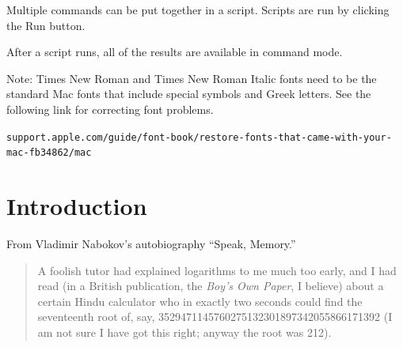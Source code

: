 \documentclass[12pt]{article}
\begin{document}
Multiple commands can be put together in a script.
Scripts are run by clicking the Run button.

\begin{center}
\end{center}

After a script runs, all of the results are available in command mode.

\bigskip
Note: Times New Roman and Times New Roman Italic fonts need
to be the standard Mac fonts that include special symbols and Greek letters.
See the following link for correcting font problems.

\bigskip
{\footnotesize\verb$support.apple.com/guide/font-book/restore-fonts-that-came-with-your-mac-fb34862/mac$}

\newpage

\section{Introduction}

From Vladimir Nabokov's autobiography ``Speak, Memory.''
\begin{quote}
A foolish tutor had explained logarithms to me much too early, and I had
read (in a British publication, the {\it Boy's Own Paper}, I believe)
about a certain Hindu calculator who in exactly two seconds could find the
seventeenth root of, say,
3529471145760275132301897342055866171392
(I am not sure I have got this right; anyway the root was 212).
\end{quote}
\end{document}

